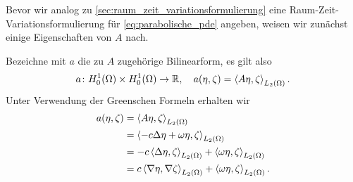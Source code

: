 Bevor wir analog zu \autoref{sec:raum_zeit_variationsformulierung} eine Raum-Zeit-Variationsformulierung für \eqref{eq:parabolische_pde} angeben, weisen wir zunächst einige Eigenschaften von $A$ nach.

Bezeichne mit $a$ die zu $A$ zugehörige Bilinearform, es gilt also
\begin{equation}
    a \colon H^{1}_{0}(\Omega) \times H^{1}_{0}(\Omega) \to \mathbb{R}, \quad a(\eta, \zeta) = \left\langle A \eta,\zeta\right\rangle_{L_{2}(\Omega)}.
\end{equation}
Unter Verwendung der Greenschen Formeln erhalten wir
\begin{equation}
    \begin{aligned}
        a(\eta, \zeta)
        &= \left\langle A \eta,\zeta\right\rangle_{L_{2}(\Omega)}
        \\&= \left\langle- c \Delta \eta + \omega \eta,\zeta\right\rangle_{L_{2}(\Omega)}
        \\&= - c \left\langle\Delta \eta,\zeta\right\rangle_{L_{2}(\Omega)} + \left\langle\omega \eta,\zeta\right\rangle_{L_{2}(\Omega)}
        \\&= c \left\langle\nabla \eta,\nabla \zeta\right\rangle_{L_{2}(\Omega)} + \left\langle\omega \eta,\zeta\right\rangle_{L_{2}(\Omega)}.
    \end{aligned}
\end{equation}


